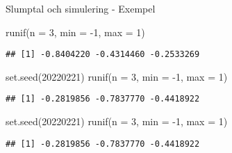 \documentclass[
  11pt,
  ignorenonframetext,
  handout]{beamer}
\newenvironment{Shaded}{\begin{snugshade}}{\end{snugshade}}
\newcommand{\AttributeTok}[1]{\textcolor[rgb]{0.77,0.63,0.00}{#1}}
\newcommand{\DecValTok}[1]{\textcolor[rgb]{0.00,0.00,0.81}{#1}}
\newcommand{\FunctionTok}[1]{\textcolor[rgb]{0.00,0.00,0.00}{#1}}
\newcommand{\NormalTok}[1]{#1}
\newcommand{\SpecialCharTok}[1]{\textcolor[rgb]{0.00,0.00,0.00}{#1}}
\begin{document}
\begin{frame}[fragile]{Slumptal och simulering - Exempel}
\protect\hypertarget{slumptal-och-simulering---exempel}{}
\begin{Shaded}
\begin{Highlighting}[]
\FunctionTok{runif}\NormalTok{(}\AttributeTok{n =} \DecValTok{3}\NormalTok{, }\AttributeTok{min =} \SpecialCharTok{{-}}\DecValTok{1}\NormalTok{, }\AttributeTok{max =} \DecValTok{1}\NormalTok{)}
\end{Highlighting}
\end{Shaded}

\pause

\begin{verbatim}
## [1] -0.8404220 -0.4314460 -0.2533269
\end{verbatim}

\pause

\begin{Shaded}
\begin{Highlighting}[]
\FunctionTok{set.seed}\NormalTok{(}\DecValTok{20220221}\NormalTok{)}
\FunctionTok{runif}\NormalTok{(}\AttributeTok{n =} \DecValTok{3}\NormalTok{, }\AttributeTok{min =} \SpecialCharTok{{-}}\DecValTok{1}\NormalTok{, }\AttributeTok{max =} \DecValTok{1}\NormalTok{)}
\end{Highlighting}
\end{Shaded}

\pause

\begin{verbatim}
## [1] -0.2819856 -0.7837770 -0.4418922
\end{verbatim}

\pause

\begin{Shaded}
\begin{Highlighting}[]
\FunctionTok{set.seed}\NormalTok{(}\DecValTok{20220221}\NormalTok{)}
\FunctionTok{runif}\NormalTok{(}\AttributeTok{n =} \DecValTok{3}\NormalTok{, }\AttributeTok{min =} \SpecialCharTok{{-}}\DecValTok{1}\NormalTok{, }\AttributeTok{max =} \DecValTok{1}\NormalTok{)}
\end{Highlighting}
\end{Shaded}

\pause

\begin{verbatim}
## [1] -0.2819856 -0.7837770 -0.4418922
\end{verbatim}
\end{frame}
\end{document}
